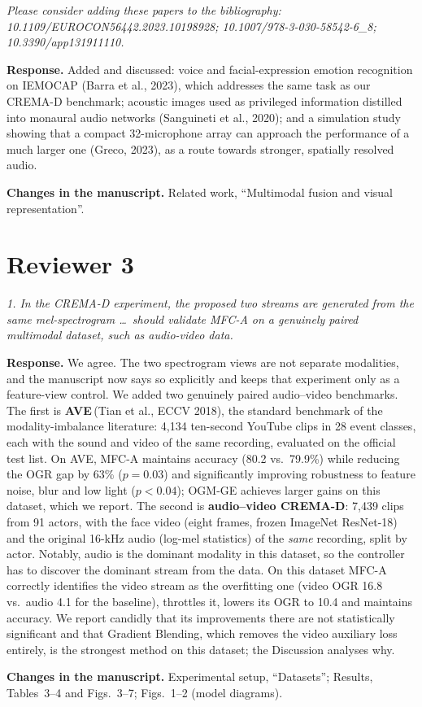 \documentclass[11pt,a4paper]{article}
\newcommand{\rc}[1]{\par\noindent\colorbox{gray!12}{\parbox{\dimexpr\linewidth-2\fboxsep}{\small\textit{#1}}}\par}
\newcommand{\resp}{\par\noindent\textbf{Response.} }
\newcommand{\chg}{\par\noindent\textbf{Changes in the manuscript.} }
\begin{document}
\rc{Please consider adding these papers to the bibliography: 10.1109/EUROCON56442.2023.10198928; 10.1007/978-3-030-58542-6\_8; 10.3390/app131911110.}
\resp Added and discussed: voice and facial-expression emotion recognition on IEMOCAP (Barra et al., 2023), which addresses the same task as our CREMA-D benchmark; acoustic images used as privileged information distilled into monaural audio networks (Sanguineti et al., 2020); and a simulation study showing that a compact 32-microphone array can approach the performance of a much larger one (Greco, 2023), as a route towards stronger, spatially resolved audio.
\chg Related work, ``Multimodal fusion and visual representation''.

\section*{Reviewer 3}

\rc{1. In the CREMA-D experiment, the proposed two streams are generated from the same mel-spectrogram \ldots\ should validate MFC-A on a genuinely paired multimodal dataset, such as audio-video data.}
\resp We agree. The two spectrogram views are not separate modalities, and the manuscript now says so explicitly and keeps that experiment only as a feature-view control. We added two genuinely paired audio--video benchmarks. The first is \textbf{AVE}\,(Tian et al., ECCV 2018), the standard benchmark of the modality-imbalance literature: 4,134 ten-second YouTube clips in 28 event classes, each with the sound and video of the same recording, evaluated on the official test list. On AVE, MFC-A maintains accuracy (80.2 vs.\ 79.9\%) while reducing the OGR gap by 63\% ($p{=}0.03$) and significantly improving robustness to feature noise, blur and low light ($p<0.04$); OGM-GE achieves larger gains on this dataset, which we report. The second is \textbf{audio--video CREMA-D}: 7,439 clips from 91 actors, with the face video (eight frames, frozen ImageNet ResNet-18) and the original 16-kHz audio (log-mel statistics) of the \emph{same} recording, split by actor. Notably, audio is the dominant modality in this dataset, so the controller has to discover the dominant stream from the data. On this dataset MFC-A correctly identifies the video stream as the overfitting one (video OGR 16.8 vs.\ audio 4.1 for the baseline), throttles it, lowers its OGR to 10.4 and maintains accuracy. We report candidly that its improvements there are not statistically significant and that Gradient Blending, which removes the video auxiliary loss entirely, is the strongest method on this dataset; the Discussion analyses why.
\chg Experimental setup, ``Datasets''; Results, Tables~3--4 and Figs.~3--7; Figs.~1--2 (model diagrams).
\end{document}
